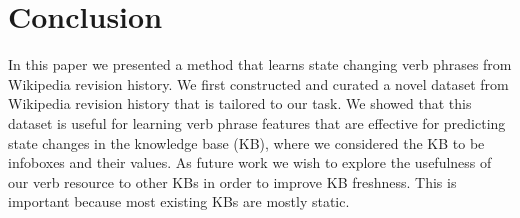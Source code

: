 \section{Conclusion}
In this paper we presented a method that learns state changing verb phrases from Wikipedia revision history.
We first constructed and curated a novel dataset from Wikipedia revision history that is tailored to our task.  We showed that this dataset is useful for learning verb phrase features that are effective for predicting state changes in the knowledge base (KB), where we considered the KB to be infoboxes and their values. As future work we wish to explore the usefulness of  our verb resource to other KBs in order to improve KB freshness. This is important because most existing KBs are mostly static.


